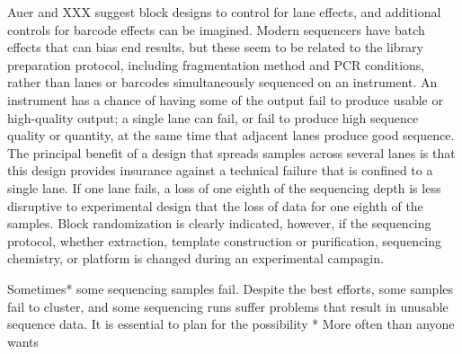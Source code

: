 \documentclass[graybox]{svmult}
\begin{document}
Auer and XXX suggest block designs to control for lane effects, and additional controls for barcode effects can be imagined.  Modern sequencers have batch effects that can bias end results, but these seem to be related to the library preparation protocol, including fragmentation method and PCR conditions, rather than lanes or barcodes simultaneously sequenced on an instrument.    An instrument has a chance of having some of the output fail to produce usable or high-quality output; a single lane can fail, or fail to produce high sequence quality or quantity, at the same time that adjacent lanes produce good sequence.
The principal benefit of a design that spreads samples across several lanes is that this design provides  insurance against a technical failure that is confined to a single lane.  If one lane fails, a loss of one eighth of the sequencing depth is less disruptive to experimental design that the loss of data for one eighth of the samples.   Block randomization is clearly indicated, however, if the sequencing protocol, whether extraction, template construction or purification, sequencing chemistry, or platform is changed during an experimental campagin.

Sometimes* some sequencing samples fail.   Despite the best efforts, some samples fail to cluster, and some sequencing runs suffer problems that result in unusable sequence data.  It is essential to plan for the possibility
* More often than anyone wants
\end{document}
